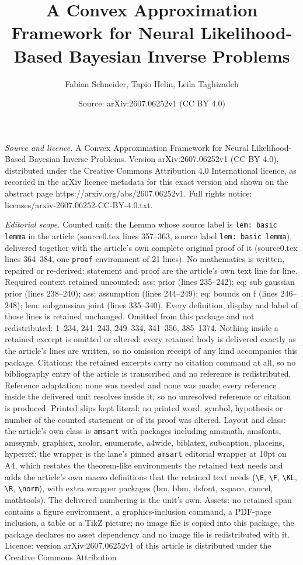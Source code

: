 \documentclass[10pt,a4paper]{amsart}
\title[A Convex Approximation Framework for Neural Likelihood-Based]{A Convex Approximation Framework for Neural Likelihood-Based Bayesian Inverse Problems}
\author{Fabian Schneider, Tapio Helin, Leila Taghizadeh}
\date{Source: arXiv:2607.06252v1 (CC BY 4.0)}
\begin{document}
\maketitle

\noindent\emph{Source and licence.} A Convex Approximation Framework for Neural Likelihood-Based Bayesian Inverse Problems. Version arXiv:2607.06252v1 (CC BY 4.0), distributed under the Creative Commons Attribution 4.0 International licence, as recorded in the arXiv licence metadata for this exact version and shown on the abstract page https://arxiv.org/abs/2607.06252v1. Full rights notice: licenses/arxiv-2607.06252-CC-BY-4.0.txt.\par\smallskip

\noindent\textit{Editorial scope.} Counted unit: the Lemma whose source label is \texttt{lem: basic lemma} in the article (source0.tex lines 357--363, source label \texttt{lem: basic lemma}), delivered together with the article's own complete original proof of it (source0.tex lines 364--384, one \texttt{proof} environment of 21 lines). No mathematics is written, repaired or re-derived: statement and proof are the article's own text line for line. Required context retained uncounted: ass: prior (lines 235--242); eq: sub gaussian prior (lines 238--240); ass: assumption (lines 244--249); eq: bounds on f (lines 246--248); lem: subgaussian joint (lines 335--340). Every definition, display and label of those lines is retained unchanged. Omitted from this package and not redistributed: 1--234, 241--243, 249--334, 341--356, 385--1374. Nothing inside a retained excerpt is omitted or altered: every retained body is delivered exactly as the article's lines are written, so no omission receipt of any kind accompanies this package. Citations: the retained excerpts carry no citation command at all, so no bibliography entry of the article is transcribed and no reference is redistributed. Reference adaptation: none was needed and none was made; every reference inside the delivered unit resolves inside it, so no unresolved reference or citation is produced. Printed slips kept literal: no printed word, symbol, hypothesis or number of the counted statement or of its proof was altered. Layout and class: the article's own class is \texttt{amsart} with packages including amsmath, amsfonts, amssymb, graphicx, xcolor, enumerate, a4wide, biblatex, subcaption, placeins, hyperref; the wrapper is the lane's pinned \texttt{amsart} editorial wrapper at 10pt on A4, which restates the theorem-like environments the retained text needs and adds the article's own macro definitions that the retained text needs (\texttt{\textbackslash E}, \texttt{\textbackslash F}, \texttt{\textbackslash KL}, \texttt{\textbackslash R}, \texttt{\textbackslash norm}), with extra wrapper packages (bm, bbm, dsfont, xspace, cancel, mathtools). The delivered numbering is the unit's own. Assets: no retained span contains a figure environment, a graphics-inclusion command, a PDF-page inclusion, a table or a TikZ picture; no image file is copied into this package, the package declares no asset dependency and no image file is redistributed with it. Licence: version arXiv:2607.06252v1 of this article is distributed under the Creative Commons Attribution 
\end{document}
